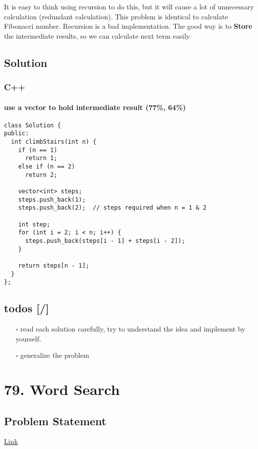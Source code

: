 \documentclass[11pt]{article}
\begin{document}
It is easy to think using recursion to do this, but it will cause a lot of unnecessary calculation (redundant calculation). This problem is identical to calculate Fibonacci number. Recursion is a bad implementation. The good way is to \textbf{Store} the intermediate results, so we can calculate next term easily.

\subsection{Solution}
\label{sec:orgc4decbb}
\subsubsection{C++}
\label{sec:org997f41a}
\paragraph{use a vector to hold intermediate result (77\%, 64\%)}
\label{sec:org0a9c079}
\begin{verbatim}
class Solution {
public:
  int climbStairs(int n) {
    if (n == 1)
      return 1;
    else if (n == 2)
      return 2;

    vector<int> steps;
    steps.push_back(1);
    steps.push_back(2);  // steps required when n = 1 & 2

    int step;
    for (int i = 2; i < n; i++) {
      steps.push_back(steps[i - 1] + steps[i - 2]);
    }

    return steps[n - 1];
  }
};
\end{verbatim}

\subsection{todos [/]}
\label{sec:org275b1f5}
\begin{itemize}
\item[{$\square$}] read each solution carefully, try to understand the idea and implement by yourself.
\item[{$\square$}] generalize the problem
\end{itemize}

\section{79. Word Search}
\label{sec:orgaae0863}
\subsection{Problem Statement}
\label{sec:org4968e9c}
\href{https://leetcode.com/problems/word-search/}{Link}
\end{document}
